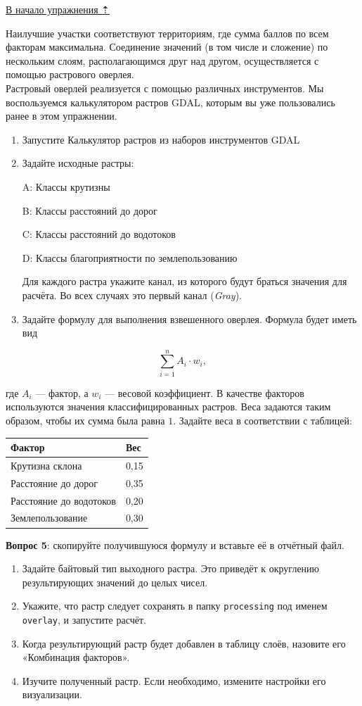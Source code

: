 \documentclass[
  12pt,
]{book}
\begin{document}
\protect\hyperlink{weighted-overlay}{В начало упражнения ⇡}

Наилучшие участки соответствуют территориям, где сумма баллов по всем факторам максимальна. Соединение значений (в том числе и сложение) по нескольким слоям, располагающимся друг над другом, осуществляется с помощью растрового оверлея.\\
Растровый оверлей реализуется с помощью различных инструментов. Мы воспользуемся калькулятором растров GDAL, которым вы уже пользовались ранее в этом упражнении.

\begin{enumerate}
\def\labelenumi{\arabic{enumi}.}
\item
  Запустите Калькулятор растров из наборов инструментов GDAL
\item
  Задайте исходные растры:

  A: Классы крутизны

  B: Классы расстояний до дорог

  C: Классы расстояний до водотоков

  D: Классы благоприятности по землепользованию

  Для каждого растра укажите канал, из которого будут браться значения для расчёта. Во всех случаях это первый канал (\emph{Gray}).
\item
  Задайте формулу для выполнения взвешенного оверлея. Формула будет иметь вид
\end{enumerate}

\[\sum_{i=1}^n A_i \cdot w_i,\]

где \(A_i\) --- фактор, а \(w_i\) --- весовой коэффициент. В качестве факторов используются значения классифицированных растров. Веса задаются таким образом, чтобы их сумма была равна \(1\). Задайте веса в соответствии с таблицей:

\begin{longtable}[]{@{}ll@{}}
\toprule
Фактор & Вес \\
\midrule
\endhead
Крутизна склона & 0,15 \\
Расстояние до дорог & 0,35 \\
Расстояние до водотоков & 0,20 \\
Землепользование & 0,30 \\
\bottomrule
\end{longtable}

\textbf{Вопрос 5}: скопируйте получившуюся формулу и вставьте её в отчётный файл.

\begin{enumerate}
\def\labelenumi{\arabic{enumi}.}
\setcounter{enumi}{3}
\item
  Задайте байтовый тип выходного растра. Это приведёт к округлению результирующих значений до целых чисел.
\item
  Укажите, что растр следует сохранять в папку \texttt{processing} под именем \texttt{overlay}, и запустите расчёт.
\item
  Когда результирующий растр будет добавлен в таблицу слоёв, назовите его «Комбинация факторов».
\item
  Изучите полученный растр. Если необходимо, измените настройки его визуализации.
\end{enumerate}
\end{document}
